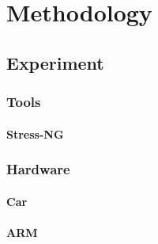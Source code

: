 \chapter{Methodology}

\section{Experiment}
\subsection{Tools}
\subsubsection{Stress-NG}
\subsection{Hardware}
\subsubsection{Car}
\subsubsection{ARM}
